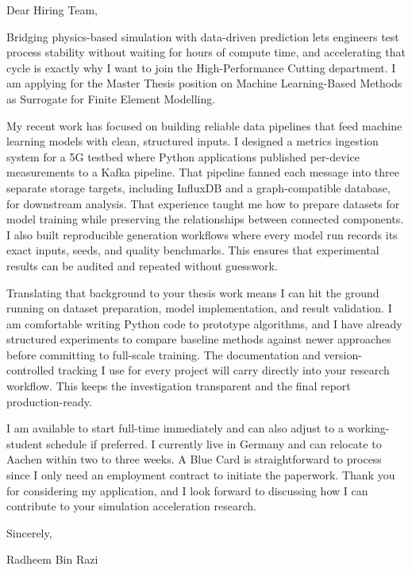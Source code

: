\documentclass[11pt,a4paper]{coverletter}
\begin{document}

\opening{Dear Hiring Team,}

Bridging physics-based simulation with data-driven prediction lets engineers test process stability without waiting for hours of compute time, and accelerating that cycle is exactly why I want to join the High-Performance Cutting department. I am applying for the Master Thesis position on Machine Learning-Based Methods as Surrogate for Finite Element Modelling.

My recent work has focused on building reliable data pipelines that feed machine learning models with clean, structured inputs. I designed a metrics ingestion system for a 5G testbed where Python applications published per-device measurements to a Kafka pipeline. That pipeline fanned each message into three separate storage targets, including InfluxDB and a graph-compatible database, for downstream analysis. That experience taught me how to prepare datasets for model training while preserving the relationships between connected components. I also built reproducible generation workflows where every model run records its exact inputs, seeds, and quality benchmarks. This ensures that experimental results can be audited and repeated without guesswork.

Translating that background to your thesis work means I can hit the ground running on dataset preparation, model implementation, and result validation. I am comfortable writing Python code to prototype algorithms, and I have already structured experiments to compare baseline methods against newer approaches before committing to full-scale training. The documentation and version-controlled tracking I use for every project will carry directly into your research workflow. This keeps the investigation transparent and the final report production-ready.

I am available to start full-time immediately and can also adjust to a working-student schedule if preferred. I currently live in Germany and can relocate to Aachen within two to three weeks. A Blue Card is straightforward to process since I only need an employment contract to initiate the paperwork. Thank you for considering my application, and I look forward to discussing how I can contribute to your simulation acceleration research.

\closing{Sincerely,}{Radheem Bin Razi}

\clearpage
{}
\end{document}
